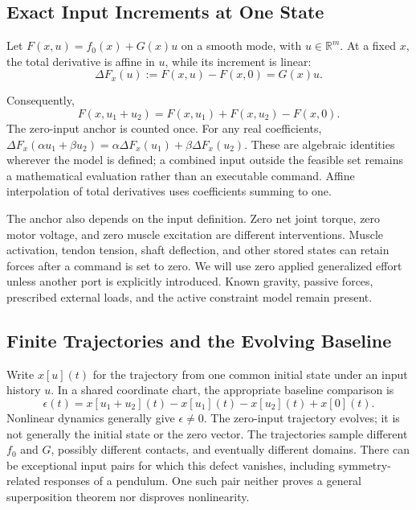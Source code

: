 \subsection{Exact Input Increments at One State}

\begin{theorem}
\label{thm:ch3:superposition}
Let $F(x,u)=f_0(x)+G(x)u$ on a smooth mode, with $u\in\mathbb R^m$. At a fixed $x$, the total derivative is affine in $u$, while its increment is linear:
\begin{equation}
\Delta F_x(u):=F(x,u)-F(x,0)=G(x)u.
\end{equation}
\end{theorem}
Consequently,
\begin{equation}
F(x,u_1+u_2)=F(x,u_1)+F(x,u_2)-F(x,0).
\label{eq:ch3:decomposition}
\end{equation}
The zero-input anchor is counted once. For any real coefficients, $\Delta F_x(\alpha u_1+\beta u_2)=\alpha\Delta F_x(u_1)+\beta\Delta F_x(u_2)$. These are algebraic identities wherever the model is defined; a combined input outside the feasible set remains a mathematical evaluation rather than an executable command. Affine interpolation of total derivatives uses coefficients summing to one.

The anchor also depends on the input definition. Zero net joint torque, zero motor voltage, and zero muscle excitation are different interventions. Muscle activation, tendon tension, shaft deflection, and other stored states can retain forces after a command is set to zero. We will use zero applied generalized effort unless another port is explicitly introduced. Known gravity, passive forces, prescribed external loads, and the active constraint model remain present.

\subsection{Finite Trajectories and the Evolving Baseline}

Write $x[u](t)$ for the trajectory from one common initial state under an input history $u$. In a shared coordinate chart, the appropriate baseline comparison is
\begin{equation}
\epsilon(t)=x[u_1+u_2](t)-x[u_1](t)-x[u_2](t)+x[0](t).
\end{equation}
Nonlinear dynamics generally give $\epsilon\ne0$. The zero-input trajectory evolves; it is not generally the initial state or the zero vector. The trajectories sample different $f_0$ and $G$, possibly different contacts, and eventually different domains. There can be exceptional input pairs for which this defect vanishes, including symmetry-related responses of a pendulum. One such pair neither proves a general superposition theorem nor disproves nonlinearity.

